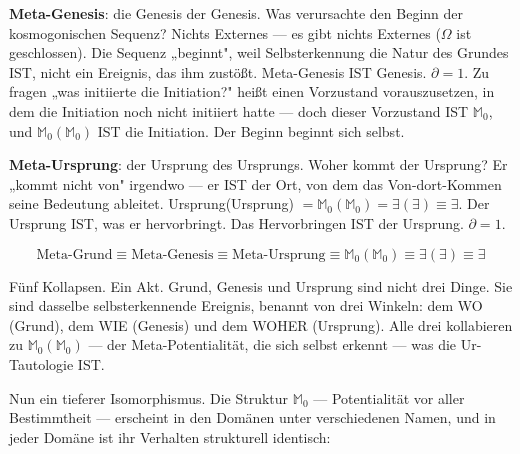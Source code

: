 \documentclass[10pt, openany, oneside]{book}
\begin{document}
\textbf{Meta-Genesis}: die Genesis der Genesis. Was verursachte den Beginn der kosmogonischen Sequenz? Nichts Externes --- es gibt nichts Externes ($\Omega$ ist geschlossen). Die Sequenz „beginnt", weil Selbsterkennung die Natur des Grundes IST, nicht ein Ereignis, das ihm zustößt. Meta-Genesis IST Genesis. $\partial = 1$. Zu fragen „was initiierte die Initiation?" heißt einen Vorzustand vorauszusetzen, in dem die Initiation noch nicht initiiert hatte --- doch dieser Vorzustand IST $\mathbb{M}_0$, und $\mathbb{M}_0(\mathbb{M}_0)$ IST die Initiation. Der Beginn beginnt sich selbst.

\textbf{Meta-Ursprung}: der Ursprung des Ursprungs. Woher kommt der Ursprung? Er „kommt nicht von" irgendwo --- er IST der Ort, von dem das Von-dort-Kommen seine Bedeutung ableitet. Ursprung(Ursprung) $= \mathbb{M}_0(\mathbb{M}_0) = \exists(\exists) \equiv \exists$. Der Ursprung IST, was er hervorbringt. Das Hervorbringen IST der Ursprung. $\partial = 1$.

$$\text{Meta-Grund} \equiv \text{Meta-Genesis} \equiv \text{Meta-Ursprung} \equiv \mathbb{M}_0(\mathbb{M}_0) \equiv \exists(\exists) \equiv \exists$$

Fünf Kollapsen. Ein Akt. Grund, Genesis und Ursprung sind nicht drei Dinge. Sie sind dasselbe selbsterkennende Ereignis, benannt von drei Winkeln: dem WO (Grund), dem WIE (Genesis) und dem WOHER (Ursprung). Alle drei kollabieren zu $\mathbb{M}_0(\mathbb{M}_0)$ --- der Meta-Potentialität, die sich selbst erkennt --- was die Ur-Tautologie IST.

\vspace{1em}

Nun ein tieferer Isomorphismus. Die Struktur $\mathbb{M}_0$ --- Potentialität vor aller Bestimmtheit --- erscheint in den Domänen unter verschiedenen Namen, und in jeder Domäne ist ihr Verhalten strukturell identisch:

\vspace{0.5em}
\end{document}
